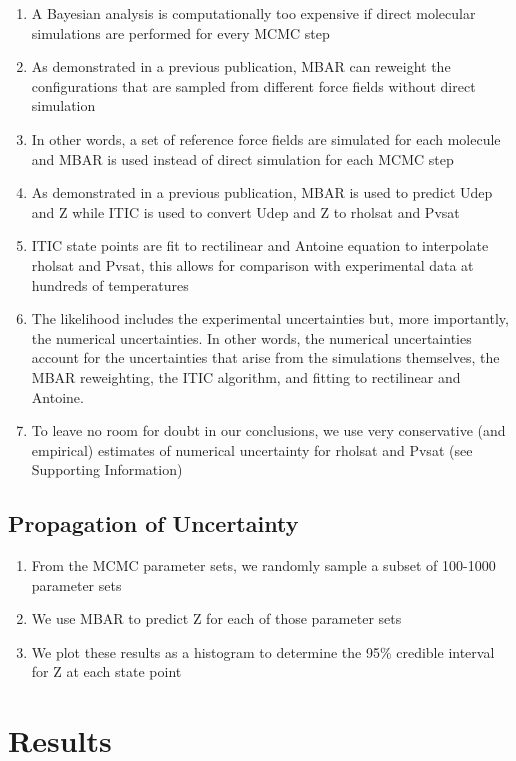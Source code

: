 \documentclass[preprint,letterpaper,floatfix,citeautoscript,aip,jcp]{revtex4-1}
\begin{document}
\begin{enumerate}
	\item A Bayesian analysis is computationally too expensive if direct molecular simulations are performed for every MCMC step
	\item As demonstrated in a previous publication, MBAR can reweight the configurations that are sampled from different force fields without direct simulation
	\item In other words, a set of reference force fields are simulated for each molecule and MBAR is used instead of direct simulation for each MCMC step
	\item As demonstrated in a previous publication, MBAR is used to predict Udep and Z while ITIC is used to convert Udep and Z to rholsat and Pvsat
	\item ITIC state points are fit to rectilinear and Antoine equation to interpolate rholsat and Pvsat, this allows for comparison with experimental data at hundreds of temperatures
	\item The likelihood includes the experimental uncertainties but, more importantly, the numerical uncertainties. In other words, the numerical uncertainties account for the uncertainties that arise from the simulations themselves, the MBAR reweighting, the ITIC algorithm, and fitting to rectilinear and Antoine.
	\item To leave no room for doubt in our conclusions, we use very conservative (and empirical) estimates of numerical uncertainty for rholsat and Pvsat (see Supporting Information)
\end{enumerate}

\subsection{Propagation of Uncertainty}
\begin{enumerate}
	\item From the MCMC parameter sets, we randomly sample a subset of 100-1000 parameter sets
	\item We use MBAR to predict Z for each of those parameter sets
	\item We plot these results as a histogram to determine the 95\% credible interval for Z at each state point
\end{enumerate}

\section{Results}
\end{document}

